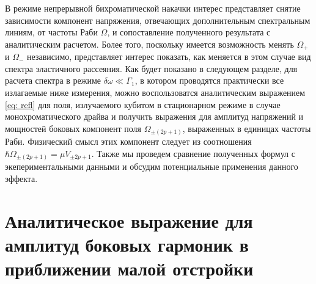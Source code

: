 В режиме непрерывной бихроматической накачки интерес представляет снятие зависимости компонент напряжения, отвечающих дополнительным спектральным линиям, от частоты Раби $\Omega$, и сопоставление  полученного результата с аналитическим расчетом. Более того, поскольку имеется возможность менять $\Omega_+$ и $\Omega_-$ независимо, представляет интерес показать, как меняется в этом случае вид спектра эластичного рассеяния. Как будет показано в следующем разделе, для расчета спектра в режиме $\delta\omega \ll \Gamma_1$, в котором проводятся практически все излагаемые ниже измерения, можно воспользоватся аналитическим выражением \eqref{eq: refl} для поля, излучаемого кубитом в стационарном режиме в случае монохроматического драйва и получить выражения для амплитуд напряжений и мощностей боковых компонент поля $\Omega_{\pm(2p+1)}$, выраженных в единицах частоты Раби. Физический смысл этих компонент следует из соотношения $\hbar\Omega_{\pm(2p+1)} = \mu V_{\pm{2p+1}}$. Также мы проведем сравнение полученных формул с экепериментальными данными и обсудим потенциальные применения данного эффекта.

\section{Аналитическое выражение для амплитуд боковых гармоник в приближении малой отстройки}
\label{sec: anal_sol}

